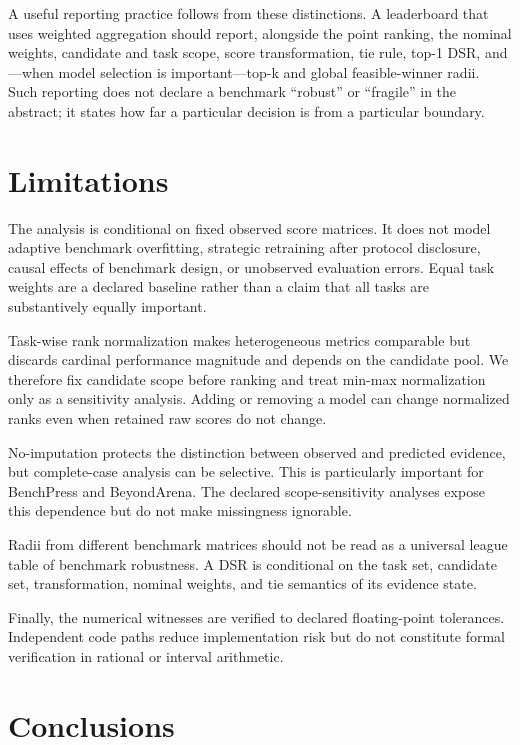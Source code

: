 \documentclass[11pt]{article}
\begin{document}
A useful reporting practice follows from these distinctions. A leaderboard that uses weighted aggregation should report, alongside the point ranking, the nominal weights, candidate and task scope, score transformation, tie rule, top-1 DSR, and—when model selection is important—top-k and global feasible-winner radii. Such reporting does not declare a benchmark “robust” or “fragile” in the abstract; it states how far a particular decision is from a particular boundary.

\section{Limitations}

The analysis is conditional on fixed observed score matrices. It does not model adaptive benchmark overfitting, strategic retraining after protocol disclosure, causal effects of benchmark design, or unobserved evaluation errors. Equal task weights are a declared baseline rather than a claim that all tasks are substantively equally important.

Task-wise rank normalization makes heterogeneous metrics comparable but discards cardinal performance magnitude and depends on the candidate pool. We therefore fix candidate scope before ranking and treat min-max normalization only as a sensitivity analysis. Adding or removing a model can change normalized ranks even when retained raw scores do not change.

No-imputation protects the distinction between observed and predicted evidence, but complete-case analysis can be selective. This is particularly important for BenchPress and BeyondArena. The declared scope-sensitivity analyses expose this dependence but do not make missingness ignorable.

Radii from different benchmark matrices should not be read as a universal league table of benchmark robustness. A DSR is conditional on the task set, candidate set, transformation, nominal weights, and tie semantics of its evidence state.

Finally, the numerical witnesses are verified to declared floating-point tolerances. Independent code paths reduce implementation risk but do not constitute formal verification in rational or interval arithmetic.

\section{Conclusions}
\end{document}

